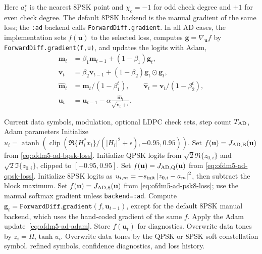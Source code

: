 \documentclass[journal]{IEEEtran}
\newcommand{\abs}[1]{\left\lvert #1 \right\rvert}
\begin{document}
Here \(a_i^\star\) is the nearest 8PSK point and
\(\chi_c=-1\) for odd check degree and \(+1\) for even check degree. The default
8PSK backend is the manual gradient of the same loss; the \texttt{:ad} backend
calls \texttt{ForwardDiff.gradient}. In all AD cases, the implementation sets
\(f(\mathbf u)\) to the selected loss, computes
\(\mathbf g=\nabla_{\mathbf u}f\) by \texttt{ForwardDiff.gradient(f,u)}, and
updates the logits with Adam,
\begin{equation}
\begin{aligned}
  \mathbf m_t&=\beta_1\mathbf m_{t-1}+(1-\beta_1)\mathbf g_t,\\
  \mathbf v_t&=\beta_2\mathbf v_{t-1}+(1-\beta_2)\mathbf g_t\odot\mathbf g_t,\\
  \widehat{\mathbf m}_t&=\mathbf m_t/(1-\beta_1^t),\qquad
  \widehat{\mathbf v}_t=\mathbf v_t/(1-\beta_2^t),\\
  \mathbf u_t&=\mathbf u_{t-1}
    -\alpha\frac{\widehat{\mathbf m}_t}
      {\sqrt{\widehat{\mathbf v}_t}+\epsilon}.
\end{aligned}
  \label{eq:ofdm5-ad-adam}
\end{equation}

\begin{algorithm}[t]
\caption{OFDM5 optional symbol refiner}
\label{alg:ofdm5-ad}
\footnotesize
\begin{algorithmic}[1]
\Require Current data symbols, modulation, optional LDPC check sets,
  step count \(T_{\rm AD}\), Adam parameters
  \State Initialize \(u_i=\operatorname{atanh}(\operatorname{clip}
    (\Re\{H_i^*x_i\}/(\abs{H_i}^2+\epsilon),-0.95,0.95))\).
  \State Set \(f(\mathbf u)=J_{\rm AD,B}(\mathbf u)\) from
    \eqref{eq:ofdm5-ad-bpsk-loss}.
  \State Initialize QPSK logits from
    \(\sqrt2\Re\{z_{0,i}\}\) and \(\sqrt2\Im\{z_{0,i}\}\), clipped to
    \([-0.95,0.95]\).
  \State Set \(f(\mathbf u)=J_{\rm AD,Q}(\mathbf u)\) from
    \eqref{eq:ofdm5-ad-qpsk-loss}.
\Else
  \State Initialize 8PSK logits as
    \(u_{i,m}=-s_{\rm init}\abs{z_{0,i}-a_m}^2\), then subtract the block maximum.
  \State Set \(f(\mathbf u)=J_{\rm AD,8}(\mathbf u)\) from
    \eqref{eq:ofdm5-ad-psk8-loss}; use the manual softmax gradient unless
    \texttt{backend=:ad}.
\EndIf
{}
  \State Compute \(\mathbf g_t=\texttt{ForwardDiff.gradient}(f,\mathbf u_{t-1})\),
    except for the default 8PSK manual backend, which uses the hand-coded gradient
    of the same \(f\).
  \State Apply the Adam update~\eqref{eq:ofdm5-ad-adam}.
  \State Store \(f(\mathbf u_t)\) for diagnostics.
\EndFor
{}
  \State Overwrite data tones by \(z_i=H_i\tanh u_i\).
\Else
  \State Overwrite data tones by the QPSK or 8PSK soft constellation symbol.
\EndIf
\State \Return refined symbols, confidence diagnostics, and loss history.
\end{algorithmic}
\end{algorithm}
\end{document}
